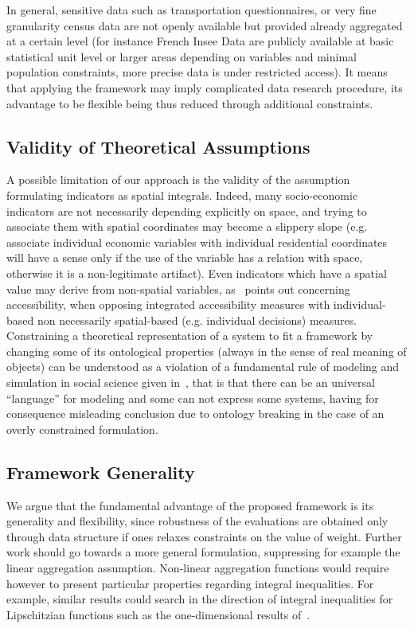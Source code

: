 \documentclass[runningheads,a4paper]{llncs2e/llncs}
\begin{document}
In general, sensitive data such as transportation questionnaires, or very fine granularity census data are not openly available but provided already aggregated at a certain level (for instance French Insee Data are publicly available at basic statistical unit level or larger areas depending on variables and minimal population constraints, more precise data is under restricted access). It means that applying the framework may imply complicated data research procedure, its advantage to be flexible being thus reduced through additional constraints.

\subsection{Validity of Theoretical Assumptions}

A possible limitation of our approach is the validity of the assumption formulating indicators as spatial integrals. Indeed, many socio-economic indicators are not necessarily depending explicitly on space, and trying to associate them with spatial coordinates may become a slippery slope (e.g. associate individual economic variables with individual residential coordinates will have a sense only if the use of the variable has a relation with space, otherwise it is a non-legitimate artifact). Even indicators which have a spatial value may derive from non-spatial variables, as~\cite{kwan1998space} points out concerning accessibility, when opposing integrated accessibility measures with individual-based non necessarily spatial-based (e.g. individual decisions) measures. Constraining a theoretical representation of a system to fit a framework by changing some of its ontological properties (always in the sense of real meaning of objects) can be understood as a violation of a fundamental rule of modeling and simulation in social science given in~\cite{banos2013HDR}, that is that there can be an universal ``language'' for modeling and some can not express some systems, having for consequence misleading conclusion due to ontology breaking in the case of an overly constrained formulation.


\subsection{Framework Generality}

We argue that the fundamental advantage of the proposed framework is its generality and flexibility, since robustness of the evaluations are obtained only through data structure if ones relaxes constraints on the value of weight. Further work should go towards a more general formulation, suppressing for example the linear aggregation assumption. Non-linear aggregation functions would require however to present particular properties regarding integral inequalities. For example, similar results could search in the direction of integral inequalities for Lipschitzian functions such as the one-dimensional results of~\cite{dragomir1999ostrowski}.
\end{document}
